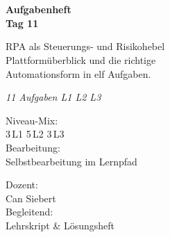 \documentclass[11pt,a4paper,oneside]{article}
\newcommand{\caveatfontfallback}{\itshape}
\newcommand\caveatfont{\caveatfontfallback}%
\begin{document}
\begin{titlepage}
  \pagestyle{empty}
  \vspace*{1.5cm}
  \\[2pt]
  \noindent{\color{lpAccent}\rule{\linewidth}{1.2pt}}\\[4pt]

  \vspace{3cm}
  {\sffamily\fontsize{30}{34}\selectfont\bfseries\color{lpInk}Aufgabenheft\\Tag 11\par}

  \vspace{0.7cm}
  {\sffamily\large\color{lpGray}RPA als Steuerungs- und Risiko\-hebel \textendash{}\\Plattform\"uberblick und die richtige\\Automationsform in elf Aufgaben.\par}

  \vspace{1.5cm}
  {\caveatfont\LARGE\color{lpAmber}11 Aufgaben \textperiodcentered{} L1 \textperiodcentered{} L2 \textperiodcentered{} L3}\par

  \vfill

  \noindent\begin{minipage}{0.55\linewidth}
    {\sffamily\footnotesize\color{lpGray}Niveau-Mix:}\\
    {\sffamily\small\color{lpInk}3\,\textsf{L1} \textperiodcentered{} 5\,\textsf{L2} \textperiodcentered{} 3\,\textsf{L3}}\\[10pt]
    {\sffamily\footnotesize\color{lpGray}Bearbeitung:}\\
    {\sffamily\small\color{lpInk}Selbstbearbeitung im Lernpfad}
  \end{minipage}\hfill
  \begin{minipage}{0.4\linewidth}
    \raggedleft
    {\sffamily\footnotesize\color{lpGray}Dozent:}\\
    {\sffamily\small\color{lpInk}Can Siebert}\\[10pt]
    {\sffamily\footnotesize\color{lpGray}Begleitend:}\\
    {\sffamily\small\color{lpInk}Lehrskript \& L\"osungsheft}
  \end{minipage}

  \vspace{0.5cm}
  \noindent{\color{lpAccent}\rule{\linewidth}{0.6pt}}
\end{titlepage}
\end{document}
